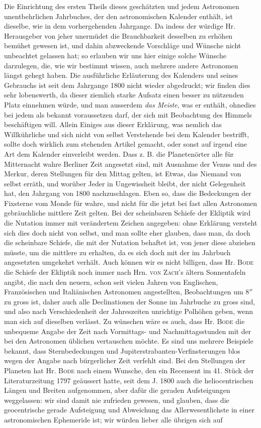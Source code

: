 Die Einrichtung des ersten Theils dieses geschätzten und jedem Astronomen unentbehrlichen Jahrbuches, der den astronomischen Kalender enthält, ist dieselbe, wie in dem vorhergehenden Jahrgange. Da indess der würdige Hr. Herausgeber von jeher unermüdet die Brauchbarkeit desselben zu erhöhen bemühet gewesen ist, und dahin abzweckende Vorschläge und Wünsche nicht unbeachtet gelassen hat; so erlauben wir uns hier einige solche Wünsche darzulegen, die, wie wir bestimmt wissen, auch mehrere andere Astronomen längst gehegt haben. Die ausführliche Erläuterung des Kalenders und seines Gebrauchs ist seit dem Jahrgange 1800 nicht wieder abgedruckt; wir finden dies sehr lobenswerth, da dieser ziemlich starke Aufsatz einen besser zu nützenden Platz einnehmen würde, und man ausserdem \emph{das Meiste}, was er enthält, ohnedies bei jedem als bekannt voraussetzen darf, der sich mit Beobachtung des Himmels beschäftigen will. Allein Einiges aus dieser Erklärung, was nemlich das Willkührliche und sich nicht von selbst Verstehende bei dem Kalender bestrifft, sollte doch wirklich zum stehenden Artikel gemacht, oder sonst auf irgend eine Art dem Kalender einverleibt werden. Dass z. B. die Planetenörter alle für Mitternacht wahre Berliner Zeit angesetzt sind, mit Ausnahme der Venus und des Merkur, deren Stellungen für den Mittag gelten, ist Etwas, das Niemand von selbst erräth, und worüber Jeder in Ungewissheit bleibt, der nicht Gelegenheit hat, den Jahrgang von 1800 nachzuschlagen. Eben so, dass die Bedeckungen der Fixsterne vom Monde für wahre, und nicht für die jetzt bei fast allen Astronomen gebräuchliche mittlere Zeit gelten. Bei der scheinbaren Schiefe der Ekliptik wird die Nutation immer mit verändertem Zeichen angegeben: ohne Erklärung versteht sich dies doch nicht von selbst, und man sollte eher glauben, dass man, da doch die scheinbare Schiefe, die mit der Nutation behaftet ist, von jener diese abziehen müsste, um die mittlere zu erhalten, da es sich doch mit der im Jahrbuch angesetzten umgekehrt verhält. Auch können wir es nicht billigen, dass Hr. \textsc{Bode} die Schiefe der Ekliptik noch immer nach Hrn. \textsc{von Zach}'s ältern Sonnentafeln angibt, die nach den neuern, schon seit vielen Jahren von Englischen, Französischen und Italiänischen Astronomen angestellten, Beobachtungen um $8''$ zu gross ist, daher auch alle Declinationen der Sonne im Jahrbuche zu gross sind, und also nach Verschiedenheit der Jahreszeiten unrichtige Polhöhen geben, wenn man sich auf dieselben verlässt. Zu wünschen wäre es auch, dass Hr. \textsc{Bode} die unbequeme Angabe der Zeit nach Vormittags- und Nachmittagsstunden mit der bei den Astronomen üblichen vertauschen möchte. Es sind uns mehrere Beispiele bekannt, dass Sternbedeckungen und Jupiterstrabanten-Verfinsterungen blos wegen der Angabe nach bürgerlicher Zeit verfehlt sind. Bei den Stellungen der Planeten hat Hr. \textsc{Bode} nach einem Wunsche, den ein Recensent im 41. Stück der Literaturzeitung 1797 geäussert hatte, seit dem J. 1800 auch die heliocentrischen Längen und Breiten aufgenommen, aber dafür die geraden Aufsteigungen weggelassen: wir sind damit nie zufrieden gewesen, und glauben, dass die geocentrische gerade Aufsteigung und Abweichung das Allerwesentlichste in einer astronomischen Ephemeride ist; wir würden lieber alle übrigen sich auf 